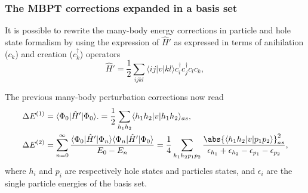 \documentclass[xcolor=pdftex,hyperref={pdfpagelabels=false},table]{beamer}
\begin{document}
\begin{frame}
\frametitle{The MBPT corrections expanded in a basis set}
\begin{scriptsize}
It is possible to rewrite the many-body energy corrections in particle and hole state formalism by using the expression of $\hat{H}'$ as expressed in terms of anihilation ($c_k$) and creation ($c_k^{\dagger}$) operators 
\begin{equation}
\nonumber
\hat{H}'= \frac{1}{2} \sum_{ijkl} \langle ij | v | kl \rangle c_i^{\dagger} c_j^{\dagger}  c_l c_k,
\end{equation}

The previous many-body perturbation corrections now read
\begin{align}
\Delta E^{(1)} &= \langle   \Phi_0  | \hat{H}' | \Phi_0 \rangle.= \frac{1}{2} \sum_{h_1 h_2} \langle h_1 h_2 |v| h_1 h_2\rangle_{as}, \\ \nonumber
\Delta E^{(2)} &= \sum_{n=0}^{\infty} \frac{\langle \Phi_0 |\hat{H}'| \Phi_n  \rangle \langle \Phi_n |\hat{H}'| \Phi_0 \rangle}{E_0 - E_n} = \frac{1}{4} \sum_{h_1 h_2 p_1 p_2} \frac{\abs{\langle h_1 h_2 |v|p_1 p_2 \rangle}_{as}^2}{\epsilon_{h_1}+\epsilon_{h_2}-\epsilon_{p_1}-\epsilon_{p_2}},
\end{align}
where $h_i$ and $p_i$ are respectively hole states and particles states, and $\epsilon_i$ are the single particle energies of the basis set.
\end{scriptsize}
\end{frame}
\end{document}
